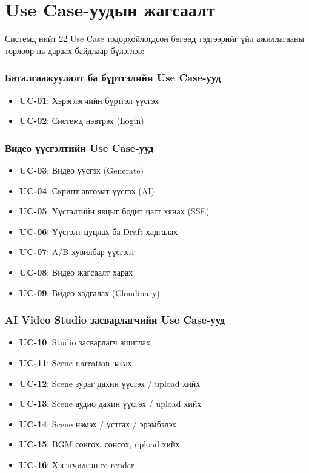 \section{Use Case-уудын жагсаалт}

Системд нийт 22 Use Case тодорхойлогдсон бөгөөд тэдгээрийг үйл ажиллагааны төрлөөр нь дараах байдлаар бүлэглэв:

\subsubsection*{Баталгаажуулалт ба бүртгэлийн Use Case-ууд}
\begin{itemize}
  \item \textbf{UC-01}: Хэрэглэгчийн бүртгэл үүсгэх
  \item \textbf{UC-02}: Системд нэвтрэх (Login)
\end{itemize}

\subsubsection*{Видео үүсгэлтийн Use Case-ууд}
\begin{itemize}
  \item \textbf{UC-03}: Видео үүсгэх (Generate)
  \item \textbf{UC-04}: Скрипт автомат үүсгэх (AI)
  \item \textbf{UC-05}: Үүсгэлтийн явцыг бодит цагт хянах (SSE)
  \item \textbf{UC-06}: Үүсгэлт цуцлах ба Draft хадгалах
  \item \textbf{UC-07}: A/B хувилбар үүсгэлт
  \item \textbf{UC-08}: Видео жагсаалт харах
  \item \textbf{UC-09}: Видео хадгалах (Cloudinary)
\end{itemize}

\subsubsection*{AI Video Studio засварлагчийн Use Case-ууд}
\begin{itemize}
  \item \textbf{UC-10}: Studio засварлагч ашиглах
  \item \textbf{UC-11}: Scene narration засах
  \item \textbf{UC-12}: Scene зураг дахин үүсгэх / upload хийх
  \item \textbf{UC-13}: Scene аудио дахин үүсгэх / upload хийх
  \item \textbf{UC-14}: Scene нэмэх / устгах / эрэмбэлэх
  \item \textbf{UC-15}: BGM сонгох, сонсох, upload хийх
  \item \textbf{UC-16}: Хэсэгчилсэн re-render
\end{itemize}

